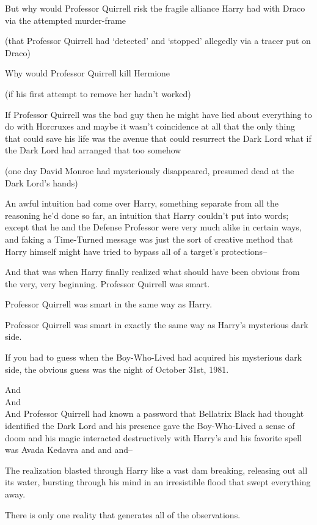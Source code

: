 But why would Professor Quirrell risk the fragile alliance Harry had with Draco via the attempted murder-frame

(that Professor Quirrell had `detected' and `stopped' allegedly via a tracer put on Draco)

Why would Professor Quirrell kill Hermione

(if his first attempt to remove her hadn't worked)

If Professor Quirrell was the bad guy then he might have lied about everything to do with Horcruxes and maybe it wasn't coincidence at all that the only thing that could save his life was the avenue that could resurrect the Dark Lord what if the Dark Lord had arranged that too somehow

(one day David Monroe had mysteriously disappeared, presumed dead at the Dark Lord's hands)

An awful intuition had come over Harry, something separate from all the reasoning he'd done so far, an intuition that Harry couldn't put into words; except that he and the Defense Professor were very much alike in certain ways, and faking a Time-Turned message was just the sort of creative method that Harry himself might have tried to bypass all of a target's protections\---

And that was when Harry finally realized what should have been obvious from the very, very beginning. \later Professor Quirrell was smart.

Professor Quirrell was smart in the same way as Harry.

Professor Quirrell was smart in exactly the same way as Harry's mysterious dark side.

If you had to guess when the Boy-Who-Lived had acquired his mysterious dark side, the obvious guess was the night of October 31st, 1981.

\later

\noindent And\\
And\\
And Professor Quirrell had known a password that Bellatrix Black had thought identified the Dark Lord and his presence gave the Boy-Who-Lived a sense of doom and his magic interacted destructively with Harry's and his favorite spell was Avada Kedavra and and and\---

The realization blasted through Harry like a vast dam breaking, releasing out all its water, bursting through his mind in an irresistible flood that swept everything away.

There is only one reality that generates all of the observations.

